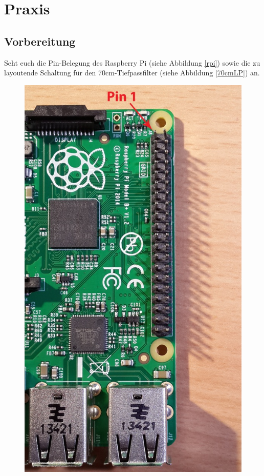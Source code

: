 \section*{Praxis}

\subsection*{Vorbereitung}

Seht euch die Pin-Belegung des Raspberry Pi (siehe Abbildung \ref{rpi}) sowie
die zu layoutende Schaltung für den 70cm-Tiefpassfilter (siehe Abbildung
\ref{70cmLP}) an.

\begin{figure}[H]
    \centering
    \includegraphics[height=0.4\textheight]{Schwingkreis/Bilder/B_plus_hdr_sm.jpg}

\end{figure}
